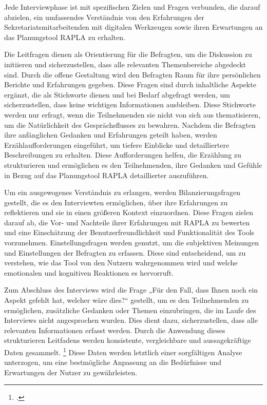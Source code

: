 Jede
Interviewphase ist mit spezifischen Zielen und Fragen verbunden, die darauf abzielen, ein
umfassendes Verständnis von den Erfahrungen der Sekretariatsmitarbeitenden mit digitalen
Werkzeugen sowie ihren Erwartungen an das Planungstool \ac{RAPLA} zu erhalten.

Die Leitfragen dienen als Orientierung für die Befragten, um die Diskussion zu initiieren und sicherzustellen,
dass alle relevanten Themenbereiche abgedeckt sind. Durch die offene Gestaltung wird den Befragten Raum für ihre
persönlichen Berichte und Erfahrungen gegeben. Diese Fragen sind durch inhaltliche Aspekte ergänzt, die als Stichworte dienen und bei
Bedarf abgefragt werden, um sicherzustellen, dass keine wichtigen Informationen ausbleiben.
Diese Stichworte werden nur erfragt, wenn die Teilnehmenden sie nicht von sich aus thematisieren, um die
Natürlichkeit des Gesprächsflusses zu bewahren.
Nachdem die Befragten ihre anfänglichen Gedanken und Erfahrungen geteilt haben, werden Erzählaufforderungen eingeführt,
um tiefere Einblicke und detailliertere Beschreibungen zu erhalten. Diese Aufforderungen helfen, die Erzählung zu
strukturieren und ermöglichen es den Teilnehmenden, ihre Gedanken und Gefühle in Bezug auf das Planungstool RAPLA
detaillierter auszuführen. 

Um ein ausgewogenes Verständnis zu erlangen, werden Bilanzierungsfragen gestellt, die es den Interviewten
ermöglichen, über ihre Erfahrungen zu reflektieren und sie in einen größeren Kontext einzuordnen. Diese Fragen
zielen darauf ab, die Vor- und Nachteile ihrer Erfahrungen mit RAPLA zu bewerten und eine Einschätzung der
Benutzerfreundlichkeit und Funktionalität des Tools vorzunehmen. 
Einstellungsfragen werden genutzt, um die subjektiven Meinungen und Einstellungen der Befragten
zu erfassen. Diese sind entscheidend, um zu verstehen, wie das Tool von den Nutzern wahrgenommen wird
und welche emotionalen und kognitiven Reaktionen es hervorruft. 

Zum Abschluss des Interviews wird die Frage „Für den Fall, dass Ihnen noch ein Aspekt gefehlt hat, welcher wäre dies?“ gestellt,
um es den Teilnehmenden zu ermöglichen,
zusätzliche Gedanken oder Themen einzubringen, die im Laufe des Interviews nicht angesprochen wurden. Dies
dient dazu, sicherzustellen, dass alle relevanten Informationen erfasst werden. 
Durch die Anwendung dieses strukturieren Leitfadens werden konsistente, vergleichbare und aussagekräftige Daten gesammelt.
\footcite[Vgl.][568]{baurHandbuchMethodenEmpirischen2014}
Diese Daten werden letztlich einer sorgfältigen Analyse unterzogen, um eine bestmögliche Anpassung an die Bedürfnisse und Erwartungen
der Nutzer zu gewährleisten.

